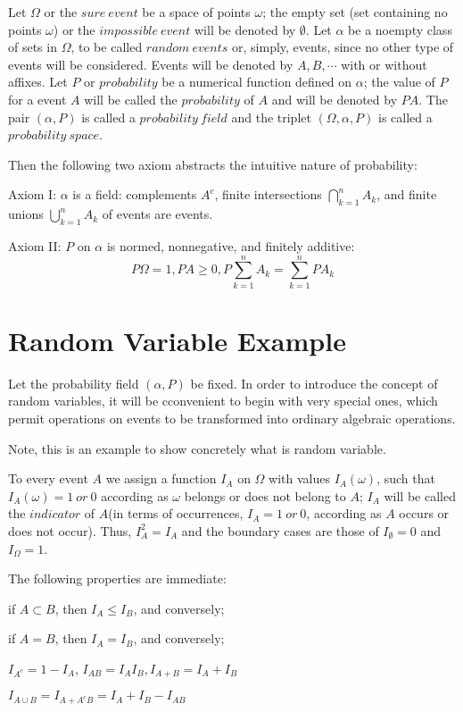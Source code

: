 \documentclass[a4paper]{book}
\begin{document}
	Let $\Omega$ or the $sure\ event$ be a space of points $\omega$; the
	empty set (set containing no points $\omega$) or the $impossible\
	event$ will be denoted by $\emptyset$. Let $\alpha$ be a noempty class
	of sets in $\Omega$, to be called $random\ events$ or, simply, events,
	since no other type of events will be considered. Events will be
	denoted by $A,B, \cdots$ with or without affixes. Let $P$ or
	$probability$ be a numerical function defined on $\alpha$; the value
	of $P$ for a event $A$ will be called the $probability$ of $A$ and
	will be denoted by $PA$. The pair $(\alpha,P)$ is called a
	$probability\ field$ and the triplet $(\Omega, \alpha, P)$ is called a
	$probability\ space$.\cite{1977probability}

	Then the following two axiom abstracts the intuitive nature of
	probability:\cite{1977probability}

	Axiom I: $\alpha$ is a field: complements $A^c$, finite intersections
	$\bigcap\limits^n_{k=1}A_k$, and finite unions
	$\bigcup\limits^n_{k=1}A_k$ of events are events.

	Axiom II: $P$ on $\alpha$ is normed, nonnegative, and finitely
	additive:
	\begin{displaymath}
		P\Omega = 1, PA \geq 0, P\sum\limits^{n}_{k=1}A_k =
		\sum\limits^{n}_{k=1}PA_k
	\end{displaymath}

\section{Random Variable Example}

	Let the probability field $(\alpha, P)$ be fixed. In order to
	introduce the concept of random variables, it will be cconvenient to
	begin with very special ones, which permit operations on events to be
	transformed into ordinary algebraic operations.\cite{1977probability}

	Note, this is an example to show concretely what is random variable.

	To every event $A$ we assign a function $I_A$ on $\Omega$ with values
	$I_A(\omega)$, such that $I_A(\omega) = 1\ or\ 0$ according as
	$\omega$ belongs or does not belong to $A$; $I_A$ will be called the
	$indicator$ of $A$(in terms of occurrences, $I_A = 1\ or\ 0$,
	according as $A$ occurs or does not occur). Thus, $I_A^2 = I_A$ and
	the boundary cases are those of $I_\emptyset = 0$ and $I_\Omega =
	1$.\cite{1977probability}

	The following properties are immediate\cite{1977probability}:
	\begin{compactitem}
	\item if $A \subset B$, then $I_A \leq I_B$, and conversely;
	\item if $A = B$, then $I_A = I_B$, and conversely;
	\item $I_{A^c} = 1 - I_A$, $I_{AB} = I_AI_B, I_{A+B} = I_A + I_B$
	\item $I_{A\cup B} = I_{A+A^cB} = I_A + I_B - I_{AB}$
	\end{compactitem}
\end{document}
